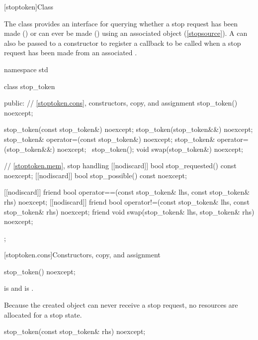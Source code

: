 %
[stoptoken]{Class }

\pnum
{}%
The class  provides an interface for querying whether
a stop request has been made ()
or can ever be made ()
using an associated  object (\ref{stopsource}).
A  can also be passed to a
 constructor
to register a callback to be called when a stop request has been made
from an associated .

\begin{codeblock}
namespace std {
  class stop_token {
  public:
    // \ref{stoptoken.cons}, constructors, copy, and assignment
    stop_token() noexcept;

    stop_token(const stop_token&) noexcept;
    stop_token(stop_token&&) noexcept;
    stop_token& operator=(const stop_token&) noexcept;
    stop_token& operator=(stop_token&&) noexcept;
    ~stop_token();
    void swap(stop_token&) noexcept;

    // \ref{stoptoken.mem}, stop handling
    [[nodiscard]] bool stop_requested() const noexcept;
    [[nodiscard]] bool stop_possible() const noexcept;

    [[nodiscard]] friend bool operator==(const stop_token& lhs, const stop_token& rhs) noexcept;
    [[nodiscard]] friend bool operator!=(const stop_token& lhs, const stop_token& rhs) noexcept;
    friend void swap(stop_token& lhs, stop_token& rhs) noexcept;
  };
}
\end{codeblock}


[stoptoken.cons]{Constructors, copy, and assignment}

%
\begin{itemdecl}
stop_token() noexcept;
\end{itemdecl}

\begin{itemdescr}
\pnum
\ensures
{} is  and
 is .
\begin{note}
Because the created  object can never receive a stop request,
no resources are allocated for a stop state.
\end{note}
\end{itemdescr}

%
\begin{itemdecl}
stop_token(const stop_token& rhs) noexcept;
\end{itemdecl}

